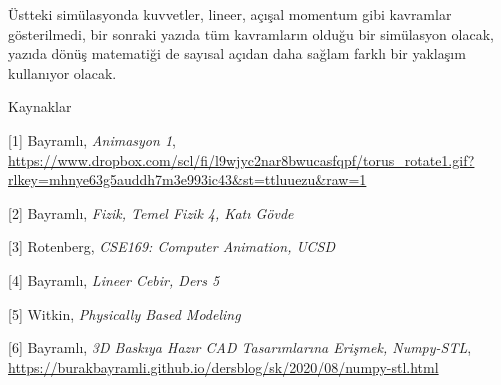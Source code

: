 \documentclass[12pt,fleqn]{article}\usepackage{../../common}
\begin{document}
Üstteki simülasyonda kuvvetler, lineer, açışal momentum gibi kavramlar
gösterilmedi, bir sonraki yazıda tüm kavramların olduğu bir simülasyon olacak,
yazıda dönüş matematiği de sayısal açıdan daha sağlam farklı bir yaklaşım
kullanıyor olacak.  

Kaynaklar

[1] Bayramlı, {\em Animasyon 1},
    \url{https://www.dropbox.com/scl/fi/l9wjyc2nar8bwucasfqpf/torus_rotate1.gif?rlkey=mhnye63g5auddh7m3e993ic43&st=ttluuezu&raw=1}

[2] Bayramlı, {\em Fizik, Temel Fizik 4, Katı Gövde}

[3] Rotenberg, {\em CSE169: Computer Animation, UCSD}

[4] Bayramlı, {\em Lineer Cebir, Ders 5}

[5] Witkin, {\em Physically Based Modeling}

[6] Bayramlı, {\em 3D Baskıya Hazır CAD Tasarımlarına Erişmek, Numpy-STL},
    \url{https://burakbayramli.github.io/dersblog/sk/2020/08/numpy-stl.html}
\end{document}
